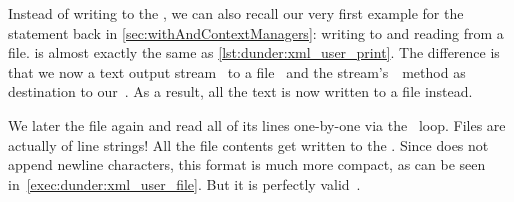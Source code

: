 Instead of writing to the , we can also recall our very first example for the  statement back in \cref{sec:withAndContextManagers}:
writing to and reading from a file.
 is almost exactly the same as \cref{lst:dunder:xml_user_print}.
The difference is that we now  a text output stream~ to a file~ and the stream's~~method as destination to our~.
As a result, all the text is now written to a file instead.

We later  the file again and read all of its lines one-by-one via the~ loop.
Files are actually  of line strings!
All the file contents get written to the .
Since  does not append newline characters, this format is much more compact, as can be seen in~\cref{exec:dunder:xml_user_file}.
But it is perfectly valid~.

